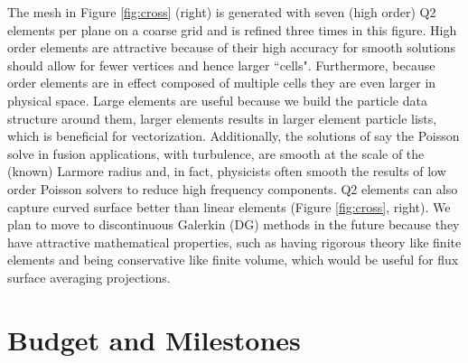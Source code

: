 \documentclass[review]{siamart}
\begin{document}
The mesh in Figure \ref{fig:cross} (right) is generated with seven (high order) Q2 elements per plane on a coarse grid and is refined three times in this figure.
High order elements are attractive because of their high accuracy for smooth solutions should allow for fewer vertices and hence larger ``cells".
Furthermore, because order elements are in effect composed of multiple cells they are even larger in physical space.
Large elements are useful because we build the particle data structure around them, larger elements results in larger element particle lists, which is beneficial for vectorization.
Additionally, the solutions of say the Poisson solve in fusion applications, with turbulence, are smooth at the scale of the (known) Larmore radius and, in fact, physicists often smooth the results of low order Poisson solvers to reduce high frequency components.
Q2 elements can also capture curved surface better than linear elements (Figure \ref{fig:cross}, right).
We plan to move to discontinuous Galerkin (DG) methods in the future because they have attractive mathematical properties, such as having rigorous theory like finite elements and being conservative like finite volume, which would be useful for flux surface averaging projections.

\section{Budget and Milestones}
\label{sec:mile}
\end{document}
